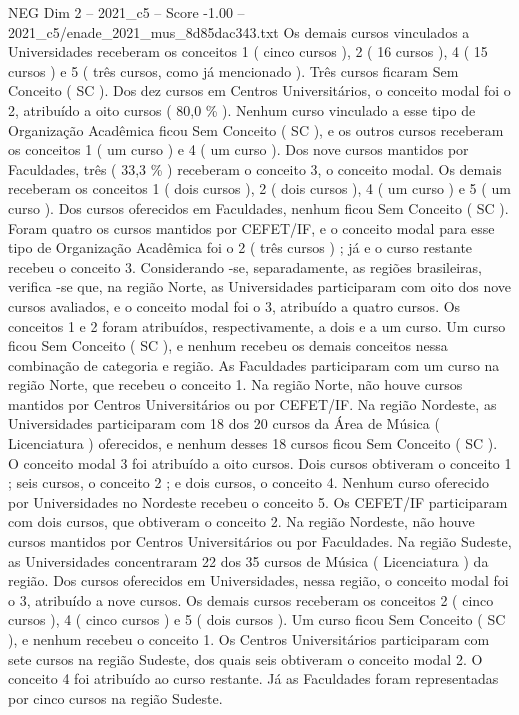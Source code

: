 \begin{textsample}{NEG Dim 2 – 2021\_c5 – Score -1.00 – 2021\_c5/enade\_2021\_mus\_8d85dac343.txt}
Os demais cursos vinculados a Universidades receberam os conceitos 1 ( cinco cursos ), 2 ( 16 cursos ), 4 ( 15 cursos ) e 5 ( três cursos, como já mencionado ).
Três cursos ficaram Sem Conceito ( SC ).
Dos dez cursos em Centros Universitários, o conceito modal foi o 2, atribuído a oito cursos ( 80,0 \% ).
Nenhum curso vinculado a esse tipo de Organização Acadêmica ficou Sem Conceito ( SC ), e os outros cursos receberam os conceitos 1 ( um curso ) e 4 ( um curso ).
Dos nove cursos mantidos por Faculdades, três ( 33,3 \% ) receberam o conceito 3, o conceito modal.
Os demais receberam os conceitos 1 ( dois cursos ), 2 ( dois cursos ), 4 ( um curso ) e 5 ( um curso ).
Dos cursos oferecidos em Faculdades, nenhum ficou Sem Conceito ( SC ).
Foram quatro os cursos mantidos por CEFET/IF, e o conceito modal para esse tipo de Organização Acadêmica foi o 2 ( três cursos ) ; já e o curso restante recebeu o conceito 3.
Considerando -se, separadamente, as regiões brasileiras, verifica -se que, na região Norte, as Universidades participaram com oito dos nove cursos avaliados, e o conceito modal foi o 3, atribuído a quatro cursos.
Os conceitos 1 e 2 foram atribuídos, respectivamente, a dois e a um curso.
Um curso ficou Sem Conceito ( SC ), e nenhum recebeu os demais conceitos nessa combinação de categoria e região.
As Faculdades participaram com um curso na região Norte, que recebeu o conceito 1.
Na região Norte, não houve cursos mantidos por Centros Universitários ou por CEFET/IF.
Na região Nordeste, as Universidades participaram com 18 dos 20 cursos da Área de Música ( Licenciatura ) oferecidos, e nenhum desses 18 cursos ficou Sem Conceito ( SC ).
O conceito modal 3 foi atribuído a oito cursos.
Dois cursos obtiveram o conceito 1 ; seis cursos, o conceito 2 ; e dois cursos, o conceito 4.
Nenhum curso oferecido por Universidades no Nordeste recebeu o conceito 5.
Os CEFET/IF participaram com dois cursos, que obtiveram o conceito 2.
Na região Nordeste, não houve cursos mantidos por Centros Universitários ou por Faculdades.
Na região Sudeste, as Universidades concentraram 22 dos 35 cursos de Música ( Licenciatura ) da região.
Dos cursos oferecidos em Universidades, nessa região, o conceito modal foi o 3, atribuído a nove cursos.
Os demais cursos receberam os conceitos 2 ( cinco cursos ), 4 ( cinco cursos ) e 5 ( dois cursos ).
Um curso ficou Sem Conceito ( SC ), e nenhum recebeu o conceito 1.
Os Centros Universitários participaram com sete cursos na região Sudeste, dos quais seis obtiveram o conceito modal 2.
O conceito 4 foi atribuído ao curso restante.
Já as Faculdades foram representadas por cinco cursos na região Sudeste.

\end{textsample}
